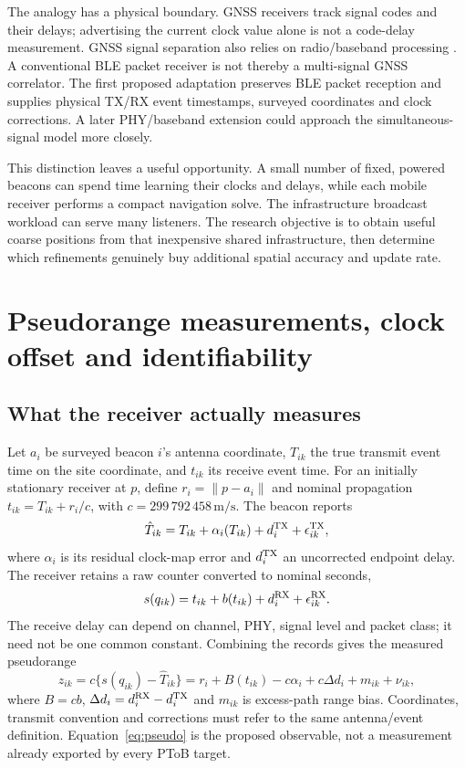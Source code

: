 \documentclass[11pt,letterpaper]{article}
\begin{document}
The analogy has a physical boundary. GNSS receivers track signal codes and their delays; advertising the current clock value alone is not a code-delay measurement. GNSS signal separation also relies on radio/baseband processing \cite{esareceiver}. A conventional BLE packet receiver is not thereby a multi-signal GNSS correlator. The first proposed adaptation preserves BLE packet reception and supplies physical TX/RX event timestamps, surveyed coordinates and clock corrections. A later PHY/baseband extension could approach the simultaneous-signal model more closely.

This distinction leaves a useful opportunity. A small number of fixed, powered beacons can spend time learning their clocks and delays, while each mobile receiver performs a compact navigation solve. The infrastructure broadcast workload can serve many listeners. The research objective is to obtain useful coarse positions from that inexpensive shared infrastructure, then determine which refinements genuinely buy additional spatial accuracy and update rate.

\section{Pseudorange measurements, clock offset and identifiability}\label{sec:model}
\subsection{What the receiver actually measures}
Let $a_i$ be surveyed beacon $i$'s antenna coordinate, $T_{ik}$ the true transmit event time on the site coordinate, and $t_{ik}$ its receive event time. For an initially stationary receiver at $p$, define $r_i=\|p-a_i\|$ and nominal propagation $t_{ik}=T_{ik}+r_i/c$, with $c=299\,792\,458\,\mathrm{m/s}$. The beacon reports
\begin{equation}
 \hat T_{ik}=T_{ik}+\alpha_i(T_{ik})+d_i^{\rm TX}+\epsilon_{ik}^{\rm TX},
\end{equation}
where $\alpha_i$ is its residual clock-map error and $d_i^{\rm TX}$ an uncorrected endpoint delay. The receiver retains a raw counter converted to nominal seconds,
\begin{equation}
 s(q_{ik})=t_{ik}+b(t_{ik})+d_i^{\rm RX}+\epsilon_{ik}^{\rm RX}.
\end{equation}
The receive delay can depend on channel, PHY, signal level and packet class; it need not be one common constant. Combining the records gives the measured pseudorange
\begin{equation}
 z_{ik}=c\{s(q_{ik})-\hat T_{ik}\}
 =r_i+B(t_{ik})-c\alpha_i+c\Delta d_i+m_{ik}+\nu_{ik},\label{eq:pseudo}
\end{equation}
where $B=cb$, $\Delta d_i=d_i^{\rm RX}-d_i^{\rm TX}$ and $m_{ik}$ is excess-path range bias. Coordinates, transmit convention and corrections must refer to the same antenna/event definition. Equation~\ref{eq:pseudo} is the proposed observable, not a measurement already exported by every PToB target.
\end{document}
